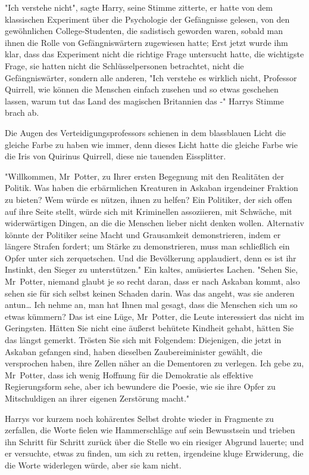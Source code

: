 {"Ich verstehe nicht", sagte Harry, seine Stimme zitterte, er hatte von dem klassischen Experiment über die Psychologie der Gefängnisse gelesen, von den gewöhnlichen College-Studenten, die sadistisch geworden waren, sobald man ihnen die Rolle von Gefängniswärtern zugewiesen hatte; Erst jetzt wurde ihm klar, dass das Experiment nicht die richtige Frage untersucht hatte, die wichtigste Frage, sie hatten nicht die Schlüsselpersonen betrachtet, nicht die Gefängniswärter, sondern alle anderen, "Ich verstehe es wirklich nicht, Professor Quirrell, wie können die Menschen einfach zusehen und so etwas geschehen lassen, warum tut das Land des magischen Britannien das -" Harrys Stimme brach ab.

Die Augen des Verteidigungsprofessors schienen in dem blassblauen Licht die gleiche Farbe zu haben wie immer, denn dieses Licht hatte die gleiche Farbe wie die Iris von Quirinus Quirrell, diese nie tauenden Eissplitter.

"Willkommen, Mr~Potter, zu Ihrer ersten Begegnung mit den Realitäten der Politik. Was haben die erbärmlichen Kreaturen in Askaban irgendeiner Fraktion zu bieten? Wem würde es nützen, ihnen zu helfen? Ein Politiker, der sich offen auf ihre Seite stellt, würde sich mit Kriminellen assoziieren, mit Schwäche, mit widerwärtigen Dingen, an die die Menschen lieber nicht denken wollen. Alternativ könnte der Politiker seine Macht und Grausamkeit demonstrieren, indem er längere Strafen fordert; um Stärke zu demonstrieren, muss man schließlich ein Opfer unter sich zerquetschen. Und die Bevölkerung applaudiert, denn es ist ihr Instinkt, den Sieger zu unterstützen." Ein kaltes, amüsiertes Lachen. "Sehen Sie, Mr~Potter, niemand glaubt je so recht daran, dass er nach Askaban kommt, also sehen sie für sich selbst keinen Schaden darin. Was das angeht, was sie anderen antun… Ich nehme an, man hat Ihnen mal gesagt, dass die Menschen sich um so etwas kümmern? Das ist eine Lüge, Mr~Potter, die Leute interessiert das nicht im Geringsten. Hätten Sie nicht eine äußerst behütete Kindheit gehabt, hätten Sie das längst gemerkt. Trösten Sie sich mit Folgendem: Diejenigen, die jetzt in Askaban gefangen sind, haben dieselben Zaubereiminister gewählt, die versprochen haben, ihre Zellen näher an die Dementoren zu verlegen. Ich gebe zu, Mr~Potter, dass ich wenig Hoffnung für die Demokratie als effektive Regierungsform sehe, aber ich bewundere die Poesie, wie sie ihre Opfer zu Mitschuldigen an ihrer eigenen Zerstörung macht."

Harrys vor kurzem noch kohärentes Selbst drohte wieder in Fragmente zu zerfallen, die Worte fielen wie Hammerschläge auf sein Bewusstsein und trieben ihn Schritt für Schritt zurück über die Stelle wo ein riesiger Abgrund lauerte; und er versuchte, etwas zu finden, um sich zu retten, irgendeine kluge Erwiderung, die die Worte widerlegen würde, aber sie kam nicht.

}
